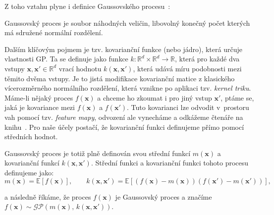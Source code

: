 Z toho vztahu plyne i definice Gaussovského procesu~\cite{rasmussen2006}:
\begin{definition}
  Gaussovský proces je soubor náhodných veličin, libovolný konečný počet kterých má sdružené normální rozdělení.
\end{definition}

Dalším klíčovým pojmem je tzv. kovarianční funkce (nebo jádro), která určuje vlastnosti GP.
Ta se definuje jako funkce $k: \mathbb{R}^d \times \mathbb{R}^d \to \mathbb{R}$, která pro každé dva vstupy $\mathbf{x}, \mathbf{x'} \in \mathbb{R}^d$ vrací hodnotu $k(\mathbf{x}, \mathbf{x'})$, která udává míru podobnosti mezi těmito dvěma vstupy.
Je to jistá modifikace kovarianční matice z klasického vícerozměrného normálního rozdělení, která vznikne po aplikaci tzv. \emph{kernel triku}.
Máme-li nějaký proces $f(\mathbf{x})$ a chceme ho zkoumat i pro jiný vstup $\mathbf{x'}$, ptáme se, jaká je kovariance mezi $f(\mathbf{x})$ a $f(\mathbf{x'})$.
Tuto kovarianci lze odvodit v~prostoru vah pomocí tzv. \emph{feature mapy}, odvození ale vynecháme a odkážeme čtenáře na knihu~\cite{rasmussen2006}.
Pro naše účely postačí, že kovarianční funkci definujeme přímo pomocí středních hodnot.

Gaussovský proces je totiž plně definován svou střední funkcí $m(\mathbf{x})$ a kovarianční funkcí $k(\mathbf{x}, \mathbf{x'})$.
Střední funkci a kovarianční funkci tohoto procesu definujeme jako:
\begin{equation}
  m(\mathbf{x}) = \mathbb{E}[f(\mathbf{x})],\qquad
  k(\mathbf{x}, \mathbf{x'}) = \mathbb{E}[(f(\mathbf{x}) - m(\mathbf{x}))(f(\mathbf{x'}) - m(\mathbf{x'}))],
\end{equation}

a následně říkáme, že proces $f(\mathbf{x})$ je Gaussovský proces a značíme $f(\mathbf{x}) \sim \mathcal{GP}(m(\mathbf{x}),\, k(\mathbf{x}, \mathbf{x'}))$.
\par

